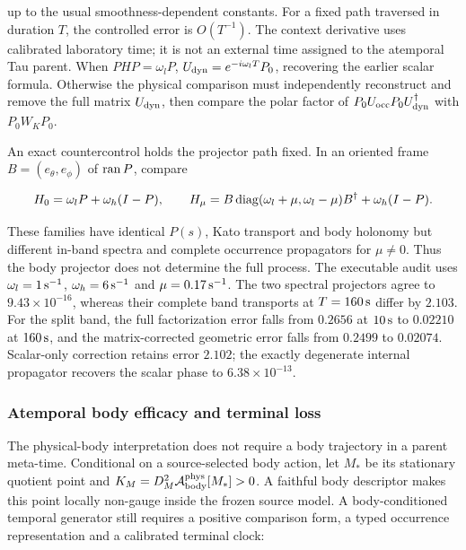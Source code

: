 \documentclass[11pt]{article}
\begin{document}
up to the usual smoothness-dependent constants. For a fixed path traversed in
duration \(T\), the controlled error is \(O(T^{-1})\). The context derivative
uses calibrated laboratory time; it is not an external time assigned to the
atemporal Tau parent. When \(PHP=\omega_lP\),
\(U_{\rm dyn}=e^{-i\omega_lT}P_0\), recovering the earlier scalar formula.
Otherwise the physical comparison must independently reconstruct and remove
the full matrix \(U_{\rm dyn}\), then compare the polar factor of
\(P_0U_{\rm occ}P_0U_{\rm dyn}^\dagger\) with \(P_0W_KP_0\).

An exact countercontrol holds the projector path fixed. In an oriented frame
\(B=(e_\theta,e_\phi)\) of \({\rm ran}\,P\), compare

\begin{equation}
 H_0=\omega_lP+\omega_h(I-P),\qquad
 H_\mu=B\,{\rm diag}(\omega_l+\mu,\omega_l-\mu)B^\dagger
       +\omega_h(I-P).
 \label{eq:elastic-sheet-same-projector-control}
\end{equation}

These families have identical \(P(s)\), Kato transport and body holonomy but
different in-band spectra and complete occurrence propagators for
\(\mu\ne0\). Thus the body projector does not determine the full process.
The executable audit uses \(\omega_l=1\,{\rm s}^{-1}\),
\(\omega_h=6\,{\rm s}^{-1}\) and \(\mu=0.17\,{\rm s}^{-1}\). The two
spectral projectors agree to \(9.43\times10^{-16}\), whereas their complete
band transports at \(T=160\,{\rm s}\) differ by \(2.103\). For the split band,
the full factorization error falls from \(0.2656\) at \(10\,{\rm s}\) to
\(0.02210\) at \(160\,{\rm s}\), and the matrix-corrected geometric error
falls from \(0.2499\) to \(0.02074\). Scalar-only correction retains error
\(2.102\); the exactly degenerate internal propagator recovers the scalar
phase to \(6.38\times10^{-13}\).

\subsubsection{Atemporal body efficacy and terminal loss}

The physical-body interpretation does not require a body trajectory in a
parent meta-time. Conditional on a source-selected body action, let
\(M_*\) be its stationary quotient point and
\(K_M=D_M^2\mathcal A_{\rm body}^{\rm phys}[M_*]>0\). A faithful body
descriptor makes this point locally non-gauge inside the frozen source model.
A body-conditioned temporal generator still requires a positive comparison
form, a typed occurrence representation and a calibrated terminal clock:
\end{document}
